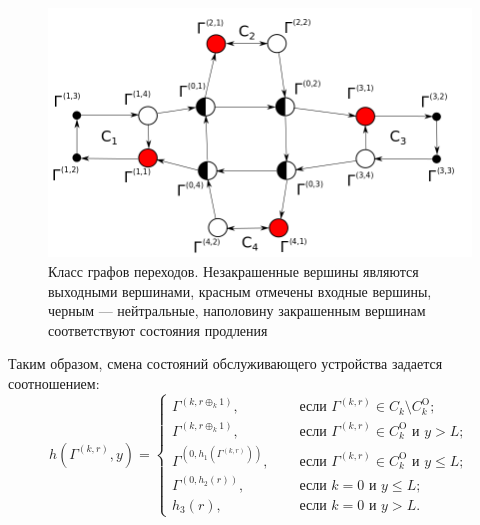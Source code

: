 \documentclass[a4paper,12pt,russian]{extarticle}
\begin{document}
\begin{figure}[hb]\centering
\includegraphics[scale=0.5]{GraphScheme3.png} 
\caption{Класс графов переходов. Незакрашенные вершины являются выходными вершинами, красным отмечены входные вершины, черным --- нейтральные, наполовину закрашенным вершинам соответствуют состояния продления}
\label{GraphScheme}
\end{figure}

Таким образом, смена состояний обслуживающего устройства задается соотношением:
\begin{equation}
h(\Gamma^{(k,r)},y) = 
\begin{cases}
\Gamma^{(k,r \oplus_k 1)},& \quad \text{ если } \Gamma^{(k,r)}\in C_k\setminus C_k^{\mathrm{O}};\\
\Gamma^{(k,r \oplus_k 1)},& \quad \text{ если } \Gamma^{(k,r)}\in C_k^{\mathrm{O}} \text{ и } y>L;\\
\Gamma^{(0,h_1(\Gamma^{(k,r)}))},& \quad \text{ если } \Gamma^{(k,r)}\in C_k^{\mathrm{O}} \text{ и } y\leqslant L;\\
\Gamma^{(0,h_2(r))},& \quad \text{ если } k=0 \text{ и } y\leqslant L;\\
h_3(r),& \quad \text{ если } k=0 \text{ и } y > L.
\end{cases}
\label{hLaw}
\end{equation}
\end{document}
